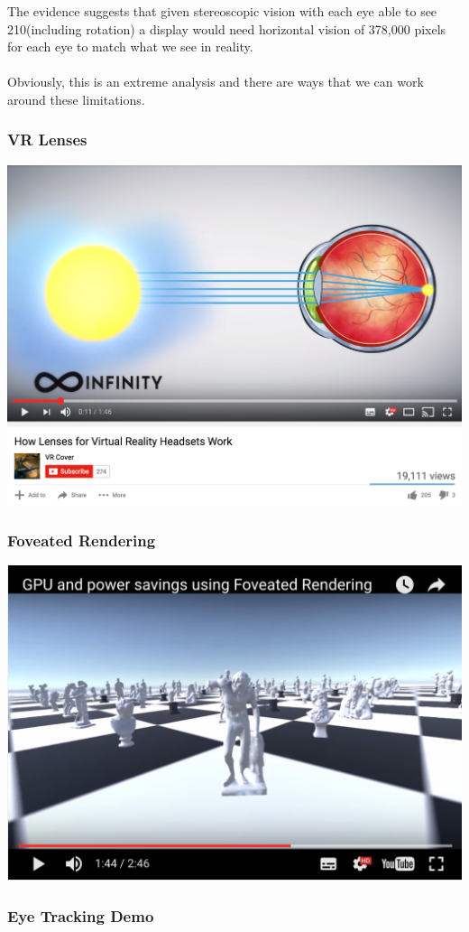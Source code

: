 \begin{frame}
	The evidence suggests that given stereoscopic vision with each eye able to see 210\degree (including rotation) a display would need horizontal vision of 378,000 pixels for each eye to match what we see in reality. \\~\\
	
	Obviously, this is an extreme analysis and there are ways that we can work around these limitations. 
	
\end{frame}
\begin{frame}
	\frametitle{VR Lenses}
	\begin{center}
		\href{https://www.youtube.com/watch?v=NCBEYaC876A}{ \includegraphics[scale=.3]{assets/lenses}  }
	\end{center}
\end{frame}

\begin{frame}
	\frametitle{Foveated Rendering}
	\begin{center}
		\href{https://www.youtube.com/watch?v=6q3w0fiD0zg}{ \includegraphics[scale=.4]{assets/foveated-rendering}  }
	\end{center}
\end{frame}

\begin{frame}
	

\end{frame}


\begin{frame}
	\frametitle{Eye Tracking Demo} 
\end{frame}



